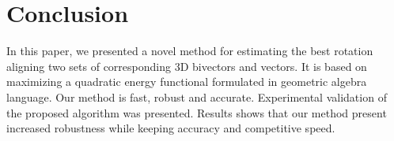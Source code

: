 \documentclass{birkjour}
\numberwithin{equation}{section}
\begin{document}

\section{Conclusion}

In this paper, we presented a novel method for estimating the best rotation aligning two sets of corresponding 3D bivectors and vectors. It is based on maximizing a quadratic energy functional formulated in geometric algebra language. Our method is fast, robust and accurate. Experimental validation of the proposed algorithm was presented. Results shows that our method present increased robustness while keeping accuracy and competitive speed.
\end{document}
